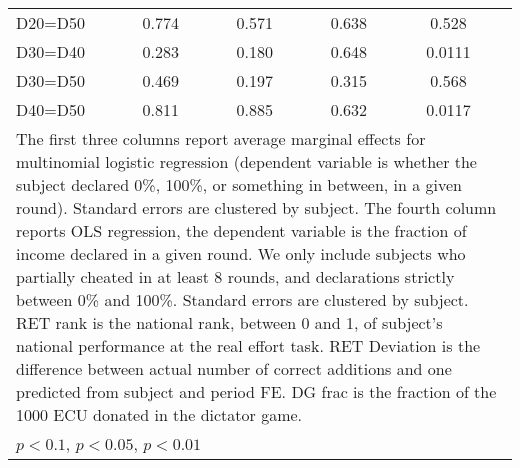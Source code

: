\begin{tabular}{l|cccccc|cc}
D20=D50         &    0.774         &         &    0.571         &         &    0.638         &         &    0.528         &         \\
D30=D40         &    0.283         &         &    0.180         &         &    0.648         &         &   0.0111         &         \\
D30=D50         &    0.469         &         &    0.197         &         &    0.315         &         &    0.568         &         \\
D40=D50         &    0.811         &         &    0.885         &         &    0.632         &         &   0.0117         &         \\
\hline\hline
\multicolumn{9}{p{16cm}}{\tiny The first three columns report average marginal effects for multinomial logistic regression (dependent variable is whether the subject declared 0\%, 100\%, or something in between, in a given round). Standard errors are clustered by subject. The fourth column reports OLS regression, the dependent variable is the fraction of income declared in a given round. We only include subjects who partially cheated in at least 8 rounds, and declarations strictly between 0\% and 100\%. Standard errors are clustered by subject. RET rank is the national rank, between 0 and 1, of subject's national performance at the real effort task. RET Deviation is the difference between actual number of correct additions and one predicted from subject and period FE. DG frac is the fraction of the 1000 ECU donated in the dictator game.}\\
\multicolumn{9}{l}{\tiny \sym{*} \(p<0.1\), \sym{**} \(p<0.05\), \sym{***} \(p<0.01\)}\\
\end{tabular}